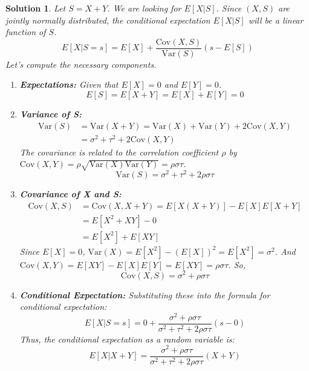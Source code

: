\documentclass[12pt]{amsart}
\newtheorem*{solution}{Solution}
\begin{document}
\begin{solution}
Let $S = X+Y$. We are looking for $E[X|S]$. Since $(X, S)$ are jointly normally distributed, the conditional expectation $E[X|S]$ will be a linear function of $S$.
$$ E[X|S=s] = E[X] + \frac{\text{Cov}(X,S)}{\text{Var}(S)}(s - E[S]) $$
Let's compute the necessary components.
\begin{enumerate}
    \item \textbf{Expectations:} Given that $E[X]=0$ and $E[Y]=0$.
    $$ E[S] = E[X+Y] = E[X] + E[Y] = 0 $$

    \item \textbf{Variance of S:}
    \begin{align*}
        \text{Var}(S) &= \text{Var}(X+Y) = \text{Var}(X) + \text{Var}(Y) + 2\text{Cov}(X,Y) \\
        &= \sigma^2 + \tau^2 + 2\text{Cov}(X,Y)
    \end{align*}
    The covariance is related to the correlation coefficient $\rho$ by $\text{Cov}(X,Y) = \rho\sqrt{\text{Var}(X)\text{Var}(Y)} = \rho\sigma\tau$.
    $$ \text{Var}(S) = \sigma^2 + \tau^2 + 2\rho\sigma\tau $$

    \item \textbf{Covariance of X and S:}
    \begin{align*}
        \text{Cov}(X,S) &= \text{Cov}(X, X+Y) = E[X(X+Y)] - E[X]E[X+Y] \\
        &= E[X^2 + XY] - 0 \\
        &= E[X^2] + E[XY]
    \end{align*}
    Since $E[X]=0$, $\text{Var}(X) = E[X^2] - (E[X])^2 = E[X^2] = \sigma^2$.
    And $\text{Cov}(X,Y) = E[XY] - E[X]E[Y] = E[XY] = \rho\sigma\tau$.
    So,
    $$ \text{Cov}(X,S) = \sigma^2 + \rho\sigma\tau $$

    \item \textbf{Conditional Expectation:} Substituting these into the formula for conditional expectation:
    $$ E[X|S=s] = 0 + \frac{\sigma^2 + \rho\sigma\tau}{\sigma^2 + \tau^2 + 2\rho\sigma\tau}(s - 0) $$
    Thus, the conditional expectation as a random variable is:
    $$ E[X | X+Y] = \frac{\sigma^2 + \rho\sigma\tau}{\sigma^2 + \tau^2 + 2\rho\sigma\tau}(X+Y) $$
\end{enumerate}
\end{solution}
\end{document}
